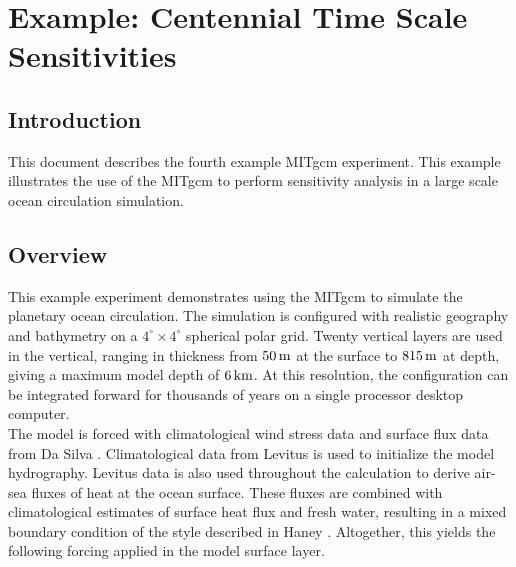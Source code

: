 
\section{Example: Centennial Time Scale Sensitivities}


%
%

\subsection{Introduction}

This document describes the fourth example MITgcm experiment.
This example illustrates the use of
the MITgcm to perform sensitivity analysis in a
large scale ocean circulation simulation.

\subsection{Overview}

This example experiment demonstrates using the MITgcm to simulate
the planetary ocean circulation. The simulation is configured
with realistic geography and bathymetry on a
$4^{\circ} \times 4^{\circ}$ spherical polar grid.
Twenty vertical layers are used in the vertical, ranging in thickness
from $50\,{\rm m}$ at the surface to $815\,{\rm m}$ at depth,
giving a maximum model depth of $6\,{\rm km}$.
At this resolution, the configuration
can be integrated forward for thousands of years on a single 
processor desktop computer.
\\

The model is forced with climatological wind stress data and surface
flux data from Da Silva \cite{DaSilva94}. Climatological data
from Levitus \cite{Levitus94} is used to initialize the model hydrography.
Levitus data is also used throughout the calculation
to derive air-sea fluxes of heat at the ocean surface.
These fluxes are combined with climatological estimates of
surface heat flux and fresh water, resulting in a mixed boundary
condition of the style described in Haney \cite{Haney}.
Altogether, this yields the following forcing applied
in the model surface layer.

